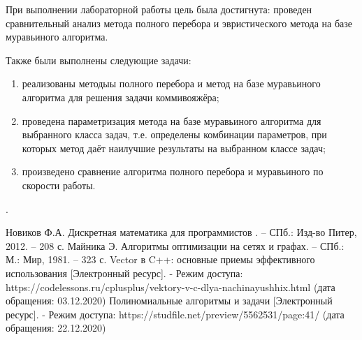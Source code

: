 \documentclass[12pt]{report}
\begin{document}
При выполнении лабораторной работы цель была достигнута: проведен сравнительный анализ метода полного перебора и эвристического метода на базе муравьиного алгоритма.

Также были выполнены следующие задачи: 
\begin{enumerate} 
	\item реализованы методыы полного перебора и метод на базе муравьиного алгоритма для решения задачи коммивояжёра;
	\item проведена параметризация метода на базе муравьиного алгоритма для выбранного класса задач, т.е. определены комбинации параметров, при которых метод даёт наилучшие результаты на выбранном классе задач;
	\item произведено сравнение алгоритма полного перебора и муравьиного по скорости работы.
\end{enumerate} .




\begin{thebibliography}{9}
	 Новиков Ф.А. Дискретная математика для программистов . –  СПб.: Изд-во Питер, 2012. – 208 с.
	 Майника Э. Алгоритмы оптимизации на сетях и графах. – СПб.: М.: Мир,
	1981. – 323 с.
	 Vector в C++: основные приемы эффективного использования [Электронный ресурс]. - Режим доступа: https://codelessons.ru/cplusplus/vektory-v-c-dlya-nachinayushhix.html (дата обращения: 03.12.2020)
	 Полиномиальные алгоритмы и задачи [Электронный ресурс]. - Режим доступа: https://studfile.net/preview/5562531/page:41/ (дата обращения: 22.12.2020)
	
\end{thebibliography}
\end{document}
